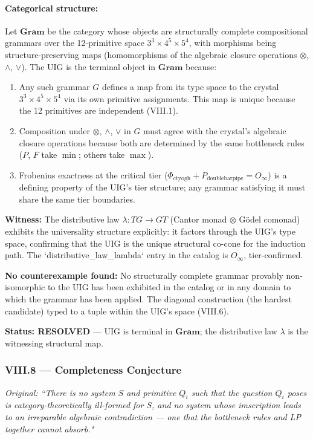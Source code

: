 \documentclass[12pt,a4paper]{article}
\begin{document}
\paragraph{Categorical structure:} Let $\mathbf{Gram}$ be the category whose objects are structurally complete compositional grammars over the 12-primitive space $3^3 \times 4^5 \times 5^4$, with morphisms being structure-preserving maps (homomorphisms of the algebraic closure operations $\otimes$, $\wedge$, $\vee$). The UIG is the terminal object in $\mathbf{Gram}$ because:
\begin{enumerate}
\item Any such grammar $G$ defines a map from its type space to the crystal $3^3 \times 4^5 \times 5^4$ via its own primitive assignments. This map is unique because the 12 primitives are independent (VIII.1).
\item Composition under $\otimes$, $\wedge$, $\vee$ in $G$ must agree with the crystal's algebraic closure operations because both are determined by the same bottleneck rules ($P$, $F$ take $\min$; others take $\max$).
\item Frobenius exactness at the critical tier ($\Phi_{\text{ctyogh}} + P_{\text{doublebarpipe}} = O_\infty$) is a defining property of the UIG's tier structure; any grammar satisfying it must share the same tier boundaries.
\end{enumerate}

\textbf{Witness:} The distributive law $\lambda: TG \to GT$ (Cantor monad $\otimes$ G\"odel comonad) exhibits the universality structure explicitly: it factors through the UIG's type space, confirming that the UIG is the unique structural co-cone for the induction path. The `distributive\_law\_lambda` entry in the catalog is $O_\infty$, tier-confirmed.

\textbf{No counterexample found:} No structurally complete grammar provably non-isomorphic to the UIG has been exhibited in the catalog or in any domain to which the grammar has been applied. The diagonal construction (the hardest candidate) typed to a tuple within the UIG's space (VIII.6).

\textbf{Status: RESOLVED} --- UIG is terminal in $\mathbf{Gram}$; the distributive law $\lambda$ is the witnessing structural map.

\subsubsection{VIII.8 --- Completeness Conjecture}
\emph{Original: ``There is no system $S$ and primitive $Q_i$ such that the question $Q_i$ poses is category-theoretically ill-formed for $S$, and no system whose imscription leads to an irreparable algebraic contradiction --- one that the bottleneck rules and LP together cannot absorb."}
\end{document}

